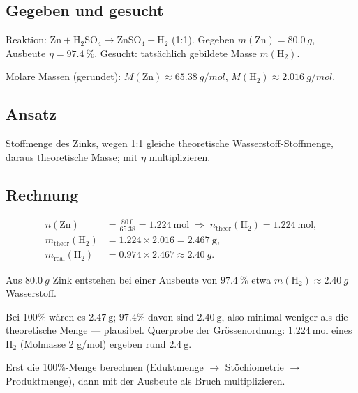 
\subsection*{Gegeben und gesucht}
Reaktion: $\mathrm{Zn} + \mathrm{H_2SO_4} \rightarrow \mathrm{ZnSO_4} +
\mathrm{H_2}$ (1:1). Gegeben $m(\mathrm{Zn}) = \qty{80.0}{g}$, Ausbeute
$\eta = \qty{97.4}{\percent}$. Gesucht: tatsächlich gebildete
Masse $m(\mathrm{H_2})$.

Molare Massen (gerundet): $M(\mathrm{Zn}) \approx \qty{65.38}{g/mol}$,
$M(\mathrm{H_2}) \approx \qty{2.016}{g/mol}$.

\subsection*{Ansatz}
Stoffmenge des Zinks, wegen 1:1 gleiche theoretische Wasserstoff-Stoffmenge,
daraus theoretische Masse; mit $\eta$ multiplizieren.

\subsection*{Rechnung}
\begin{align*}
  n(\mathrm{Zn}) &= \frac{80.0}{65.38} = 1.224\ \mathrm{mol}
  \;\Rightarrow\; n_{\text{theor}}(\mathrm{H_2}) = 1.224\ \mathrm{mol}, \\[2pt]
  m_{\text{theor}}(\mathrm{H_2}) &= 1.224 \times 2.016 = 2.467\ \mathrm{g}, \\
  m_{\text{real}}(\mathrm{H_2}) &= 0.974 \times 2.467
  \approx \qty{2.40}{g}.
\end{align*}

\begin{ergebnis}
Aus $\qty{80.0}{g}$ Zink entstehen bei einer Ausbeute von
$\qty{97.4}{\percent}$ etwa $m(\mathrm{H_2}) \approx \qty{2.40}{g}$
Wasserstoff.
\end{ergebnis}

\begin{kontrolle}
Bei 100\% wären es $2.47\ \mathrm{g}$; $97.4\%$ davon sind $2.40\ \mathrm{g}$,
also minimal weniger als die theoretische Menge --- plausibel. Querprobe der
Grössenordnung: $1.224\ \mathrm{mol}$ eines $\mathrm{H_2}$ (Molmasse 2 g/mol)
ergeben rund $2.4\ \mathrm{g}$.
\end{kontrolle}

\begin{merksatz}
Erst die 100\%-Menge berechnen (Eduktmenge $\rightarrow$ Stöchiometrie
$\rightarrow$ Produktmenge), dann mit der Ausbeute als Bruch multiplizieren.
\end{merksatz}
